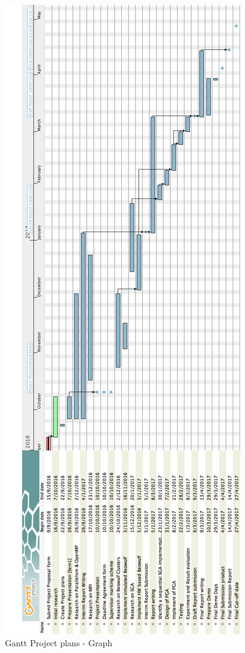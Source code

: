 \begin{figure}[!htb]
  \center
  \includegraphics[width=.7 \linewidth]{figs/FYP_Project_plans_rotated.png}
  \caption{Gantt Project plans - Graph}
  \label{fig:project_plans}
\end{figure}